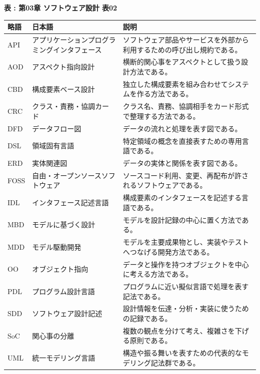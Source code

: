 \par\smallskip\noindent{}\label{tab:ch03-02}\textbf{表 \thetable: 第03章 ソフトウェア設計 表02}\par\smallskip
\begin{tabularx}{\linewidth}{L{18mm}L{43mm}Y}
\toprule
\textbf{略語} & \textbf{日本語} & \textbf{説明} \\
\midrule
API & アプリケーションプログラミングインタフェース & ソフトウェア部品やサービスを外部から利用するための呼び出し規約である。 \\
AOD & アスペクト指向設計 & 横断的関心事をアスペクトとして扱う設計方法である。 \\
CBD & 構成要素ベース設計 & 独立した構成要素を組み合わせてシステムを作る方法である。 \\
CRC & クラス・責務・協調カード & クラス名、責務、協調相手をカード形式で整理する方法である。 \\
DFD & データフロー図 & データの流れと処理を表す図である。 \\
DSL & 領域固有言語 & 特定領域の概念を直接表すための専用言語である。 \\
ERD & 実体関連図 & データの実体と関係を表す図である。 \\
FOSS & 自由・オープンソースソフトウェア & ソースコード利用、変更、再配布が許されるソフトウェアである。 \\
IDL & インタフェース記述言語 & 構成要素のインタフェースを記述する言語である。 \\
MBD & モデルに基づく設計 & モデルを設計記録の中心に置く方法である。 \\
MDD & モデル駆動開発 & モデルを主要成果物とし、実装やテストへつなげる開発方法である。 \\
OO & オブジェクト指向 & データと操作を持つオブジェクトを中心に考える方法である。 \\
PDL & プログラム設計言語 & プログラムに近い擬似言語で処理を表す記法である。 \\
SDD & ソフトウェア設計記述 & 設計情報を伝達・分析・実装に使うための記録である。 \\
SoC & 関心事の分離 & 複数の観点を分けて考え、複雑さを下げる原則である。 \\
UML & 統一モデリング言語 & 構造や振る舞いを表すための代表的なモデリング記法群である。 \\
\bottomrule
\end{tabularx}
